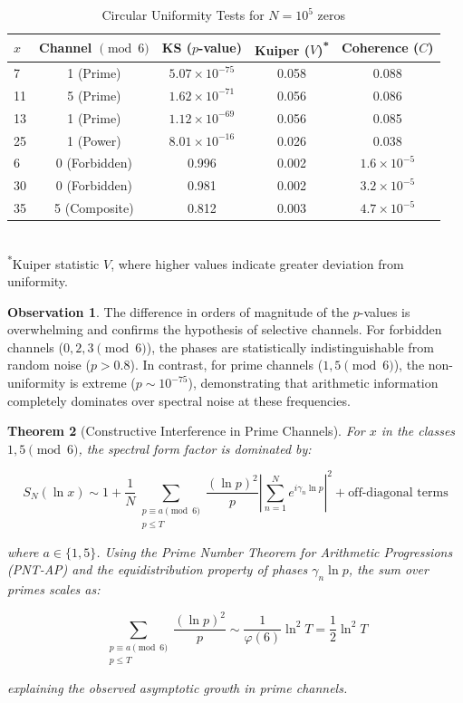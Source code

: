 \documentclass[12pt, a4paper]{article}
\theoremstyle{plain}
\newtheorem{teorema}{Theorem}[section]
\theoremstyle{definition}
\newtheorem{observacion}[teorema]{Observation}
\theoremstyle{remark}
\begin{document}
\begin{table}[H]
\centering
\caption{Circular Uniformity Tests for $N=10^5$ zeros}
\label{tab:tests_uniformidad}
\begin{tabular}{@{}lcccc@{}}
\toprule
$x$ & Channel $\pmod{6}$ & KS ($p$-value) & Kuiper ($V$)\textsuperscript{*} & Coherence ($C$) \\
\midrule
7 & 1 (Prime) & $5.07 \times 10^{-75}$ & 0.058 & 0.088 \\
11 & 5 (Prime) & $1.62 \times 10^{-71}$ & 0.056 & 0.086 \\
13 & 1 (Prime) & $1.12 \times 10^{-69}$ & 0.056 & 0.085 \\
25 & 1 (Power) & $8.01 \times 10^{-16}$ & 0.026 & 0.038 \\
6 & 0 (Forbidden) & 0.996 & 0.002 & $1.6 \times 10^{-5}$ \\
30 & 0 (Forbidden) & 0.981 & 0.002 & $3.2 \times 10^{-5}$ \\
35 & 5 (Composite) & 0.812 & 0.003 & $4.7 \times 10^{-5}$ \\
\bottomrule
\end{tabular}
\vspace{2mm}\\
\footnotesize{\textsuperscript{*}Kuiper statistic $V$, where higher values indicate greater deviation from uniformity.}
\end{table}

\begin{observacion}
The difference in orders of magnitude of the $p$-values is overwhelming and confirms the hypothesis of selective channels. For forbidden channels ($0, 2, 3 \pmod 6$), the phases are statistically indistinguishable from random noise ($p > 0.8$). In contrast, for prime channels ($1, 5 \pmod 6$), the non-uniformity is extreme ($p \sim 10^{-75}$), demonstrating that arithmetic information completely dominates over spectral noise at these frequencies.
\end{observacion}


\begin{teorema}[Constructive Interference in Prime Channels]
\label{teo:interferencia_constructiva}
For $x$ in the classes $1,5 \pmod{6}$, the spectral form factor is dominated by:

\[
S_N(\ln x) \sim 1 + \frac{1}{N} \sum_{\substack{p \equiv a \pmod{6} \\ p \leq T}} 
\frac{(\ln p)^2}{p} \left| \sum_{n=1}^N e^{i\gamma_n \ln p} \right|^2 
+ \text{off-diagonal terms}
\]

where $a \in \{1,5\}$. Using the Prime Number Theorem for Arithmetic 
Progressions (PNT-AP) and the equidistribution property of phases $\gamma_n \ln p$, 
the sum over primes scales as:

\[
\sum_{\substack{p \equiv a \pmod{6} \\ p \leq T}} \frac{(\ln p)^2}{p} \sim 
\frac{1}{\varphi(6)} \ln^2 T = \frac{1}{2} \ln^2 T
\]

explaining the observed asymptotic growth in prime channels.
\end{teorema}
\end{document}
